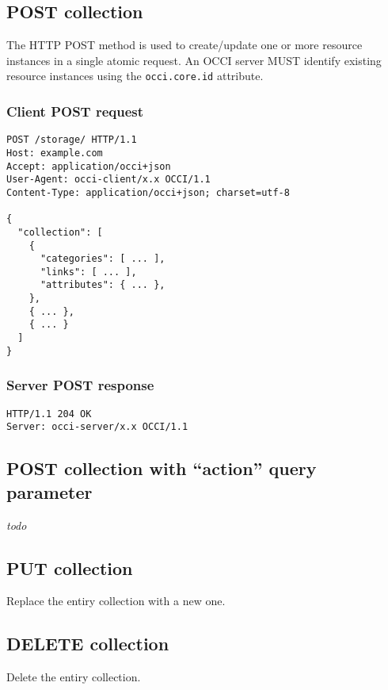 \documentclass[10pt,a4paper]{article}
\begin{document}
\subsection{POST collection}
The HTTP POST method is used to create/update one or more resource instances in
a single atomic request. An OCCI server MUST identify existing resource instances
using the {\tt occi.core.id} attribute.

\subsubsection{Client POST request}
\begin{verbatim}
POST /storage/ HTTP/1.1
Host: example.com
Accept: application/occi+json
User-Agent: occi-client/x.x OCCI/1.1
Content-Type: application/occi+json; charset=utf-8

{
  "collection": [
    {
      "categories": [ ... ],
      "links": [ ... ],
      "attributes": { ... },
    },
    { ... },
    { ... }
  ]
}
\end{verbatim}

\subsubsection{Server POST response}
\begin{verbatim}
HTTP/1.1 204 OK
Server: occi-server/x.x OCCI/1.1
\end{verbatim}

\subsection{POST collection with ``action'' query parameter}
{\em todo}

\subsection{PUT collection}
Replace the entiry collection with a new one. 

\subsection{DELETE collection}
Delete the entiry collection. 
\end{document}
